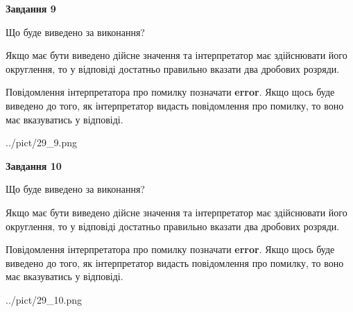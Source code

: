 \documentclass[12pt, ukrainian]{article}
\begin{document}
{\begin {Large}
{\begin {center}\textbf{Завдання 9}\end {center}}\par
Що буде виведено за виконання? \par

Якщо має бути виведено дійсне значення та інтерпретатор має здійснювати його округлення, 
то у відповіді достатньо правильно вказати два дробових розряди.

Повідомлення інтерпретатора про помилку позначати \textbf{error}.
Якщо щось буде виведено до того, як інтерпретатор видасть повідомлення про помилку, 
то воно має вказуватись у відповіді. \par

\begin{center}
	{../pict/29_9.png}
\end{center}
\newpage

{\begin {center}\textbf{Завдання 10}\end {center}}\par
Що буде виведено за виконання? \par

Якщо має бути виведено дійсне значення та інтерпретатор має здійснювати його округлення, 
то у відповіді достатньо правильно вказати два дробових розряди.

Повідомлення інтерпретатора про помилку позначати \textbf{error}.
Якщо щось буде виведено до того, як інтерпретатор видасть повідомлення про помилку, 
то воно має вказуватись у відповіді. \par

\begin{center}
	{../pict/29_10.png}
\end{center}
\newpage

\end {Large}}
\end{document}
